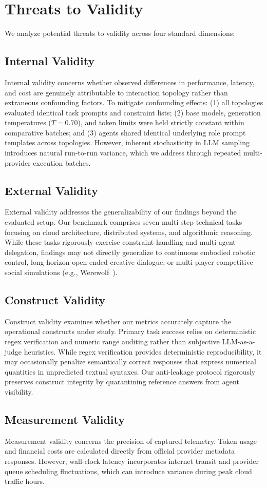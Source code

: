 \section{Threats to Validity}
\label{sec:threats_to_validity}

We analyze potential threats to validity across four standard dimensions:

\subsection{Internal Validity}
Internal validity concerns whether observed differences in performance, latency, and cost are genuinely attributable to interaction topology rather than extraneous confounding factors. To mitigate confounding effects:
(1) all topologies evaluated identical task prompts and constraint lists;
(2) base models, generation temperatures ($T=0.70$), and token limits were held strictly constant within comparative batches; and
(3) agents shared identical underlying role prompt templates across topologies. 
However, inherent stochasticity in LLM sampling introduces natural run-to-run variance, which we address through repeated multi-provider execution batches.

\subsection{External Validity}
External validity addresses the generalizability of our findings beyond the evaluated setup. Our benchmark comprises seven multi-step technical tasks focusing on cloud architecture, distributed systems, and algorithmic reasoning. While these tasks rigorously exercise constraint handling and multi-agent delegation, findings may not directly generalize to continuous embodied robotic control, long-horizon open-ended creative dialogue, or multi-player competitive social simulations (e.g., Werewolf~\cite{Zhu2025MultiAgentBench}).

\subsection{Construct Validity}
Construct validity examines whether our metrics accurately capture the operational constructs under study. Primary task success relies on deterministic regex verification and numeric range auditing rather than subjective LLM-as-a-judge heuristics. While regex verification provides deterministic reproducibility, it may occasionally penalize semantically correct responses that express numerical quantities in unpredicted textual syntaxes. Our anti-leakage protocol rigorously preserves construct integrity by quarantining reference answers from agent visibility.

\subsection{Measurement Validity}
Measurement validity concerns the precision of captured telemetry. Token usage and financial costs are calculated directly from official provider metadata responses. However, wall-clock latency incorporates internet transit and provider queue scheduling fluctuations, which can introduce variance during peak cloud traffic hours.

